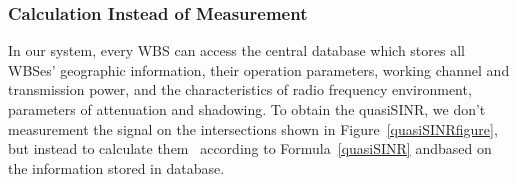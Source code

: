 


\subsubsection*{Calculation Instead of Measurement}
In our system, every WBS can access the central database which stores all WBSes' geographic information, their operation parameters, \ie working channel and transmission power, and the characteristics of radio frequency environment, \ie parameters of attenuation and shadowing.
To obtain the quasiSINR, we don't measurement the signal on the intersections shown in Figure~\ref{quasiSINRfigure}, but instead to calculate them~\cite{Jaentti11} according to Formula~\ref{quasiSINR} andbased on the information stored in database.




